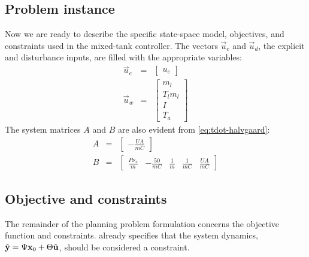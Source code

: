 \subsection{Problem instance}

Now we are ready to describe the specific state-space model, objectives, and constraints used in the mixed-tank controller.
The vectors $\vec{u}_e$ and $\vec{u}_d$, the explicit and disturbance inputs, are filled with the appropriate variables:
\begin{eqnarray}
   \vec{u}_e &=& \left[\begin{array}{c}
      u_e
   \end{array} \right]
   \\
   \vec{u}_w &=& \left[\begin{array}{cccc}
      m_l \\ T_l m_l \\ I \\ T_a
   \end{array} \right]
\end{eqnarray}
The system matrices $A$ and $B$ are also evident from \autoref{eq:tdot-halvgaard}:
\begin{eqnarray}
   A &=& \left[\begin{array}{c}
      -\frac{UA}{mC}
   \end{array} \right]
   \\
   B &=& \left[\begin{array}{ccccc}
      \frac{P \nu_x}{m} &
      -\frac{50}{mC} &
      \frac{1}{m} &
      \frac{1}{mC} &
      \frac{UA}{mC}
   \end{array} \right]
\end{eqnarray}

\subsection{Objective and constraints}

The remainder of the planning problem formulation concerns the objective function and constraints.
 already specifies that the system dynamics, $\hat{\mathbf{y}} = \Psi \mathbf{x}_0 + \Theta \hat{\mathbf{u}}$, should be considered a constraint.

